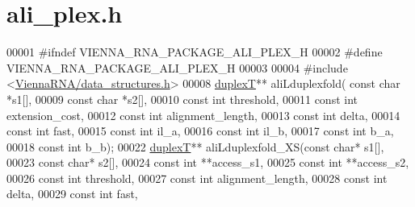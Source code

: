 \hypertarget{ali__plex_8h_source}{}\section{ali\+\_\+plex.\+h}
\label{ali__plex_8h_source}

\begin{DoxyCode}
00001 \textcolor{preprocessor}{#ifndef VIENNA\_RNA\_PACKAGE\_ALI\_PLEX\_H}
00002 \textcolor{preprocessor}{#define VIENNA\_RNA\_PACKAGE\_ALI\_PLEX\_H}
00003 
00004 \textcolor{preprocessor}{#include <\hyperlink{data__structures_8h}{ViennaRNA/data\_structures.h}>}
00008 \hyperlink{group__data__structures_structduplexT}{duplexT}** aliLduplexfold( \textcolor{keyword}{const} \textcolor{keywordtype}{char} *s1[],
00009                           \textcolor{keyword}{const} \textcolor{keywordtype}{char} *s2[],
00010                           \textcolor{keyword}{const} \textcolor{keywordtype}{int} threshold,
00011                           \textcolor{keyword}{const} \textcolor{keywordtype}{int} extension\_cost,
00012                           \textcolor{keyword}{const} \textcolor{keywordtype}{int} alignment\_length,
00013                           \textcolor{keyword}{const} \textcolor{keywordtype}{int} delta,
00014                           \textcolor{keyword}{const} \textcolor{keywordtype}{int} fast,
00015                           \textcolor{keyword}{const} \textcolor{keywordtype}{int} il\_a,
00016                           \textcolor{keyword}{const} \textcolor{keywordtype}{int} il\_b,
00017                           \textcolor{keyword}{const} \textcolor{keywordtype}{int} b\_a,
00018                           \textcolor{keyword}{const} \textcolor{keywordtype}{int} b\_b);
00022 \hyperlink{group__data__structures_structduplexT}{duplexT}** aliLduplexfold\_XS(\textcolor{keyword}{const} \textcolor{keywordtype}{char}* s1[],
00023                             \textcolor{keyword}{const} \textcolor{keywordtype}{char}* s2[],
00024                             \textcolor{keyword}{const} \textcolor{keywordtype}{int} **access\_s1,
00025                             \textcolor{keyword}{const} \textcolor{keywordtype}{int} **access\_s2, 
00026                             \textcolor{keyword}{const} \textcolor{keywordtype}{int} threshold,
00027                             \textcolor{keyword}{const} \textcolor{keywordtype}{int} alignment\_length,
00028                             \textcolor{keyword}{const} \textcolor{keywordtype}{int} delta,
00029                             \textcolor{keyword}{const} \textcolor{keywordtype}{int} fast,

\end{DoxyCode}
